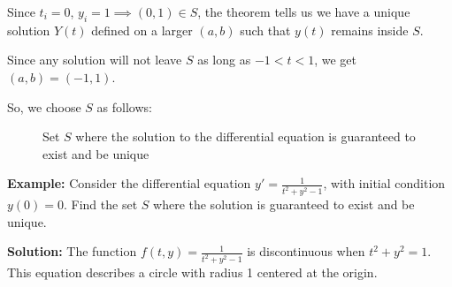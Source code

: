 \documentclass{article}
\begin{document}
Since $t_i = 0$, $y_i = 1 \implies (0,1) \in S$, the theorem tells us we have a unique solution $Y(t)$ defined on a larger $(a, b)$ such that $y(t)$ remains inside $S$.

Since any solution will not leave $S$ as long as $-1 < t < 1$, we get $(a,b) = (-1, 1)$.

So, we choose $S$ as follows:

\begin{figure}[h]
    \centering
    \caption{Set $S$ where the solution to the differential equation is guaranteed to exist and be unique}
    \label{fig:set_S_example}
\end{figure}

\pagebreak

\textbf{Example:} Consider the differential equation $y' = \frac{1}{t^2 + y^2 - 1}$, with initial condition $y(0) = 0$. Find the set $S$ where the solution is guaranteed to exist and be unique.

\textbf{Solution:} 
The function $f(t,y) = \frac{1}{t^2 + y^2 - 1}$ is discontinuous when $t^2 + y^2 = 1$. This equation describes a circle with radius 1 centered at the origin.
\end{document}
